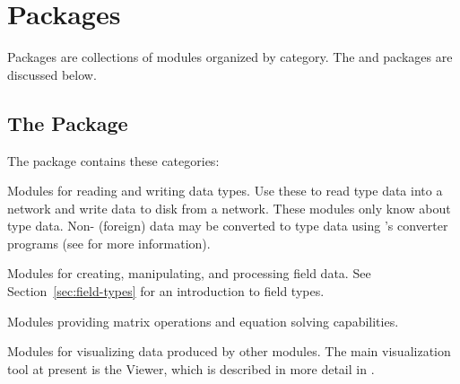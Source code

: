 %
%
%
%
%
%

\section{Packages}
\label{sec:packages}

Packages are collections of modules organized by category. The \SR{} and 
packages are discussed below. 

\subsection{The \sr{} Package}
\label{sec:srpackage}


The \sr{} package contains these categories:

\begin{description}
   Modules for reading and writing \sr{}
  data types.  Use these to read \sr{} type data into a network and
  write data to disk from a network.  These modules only know about
  \sr{} type data.  Non-\sr{} (foreign) data may be converted to \sr{}
  type data using \sr{}'s converter programs (see  for more information).
  
   Modules for creating, manipulating, and
  processing field data.  See Section~\ref{sec:field-types} for an
  introduction to \sr{} field types.
  
   Modules providing matrix operations and
  equation solving capabilities.
  
   Modules for visualizing data produced by
  other modules.  The main visualization tool at present
  is the Viewer, which is described in more detail in
  .
\end{description}

